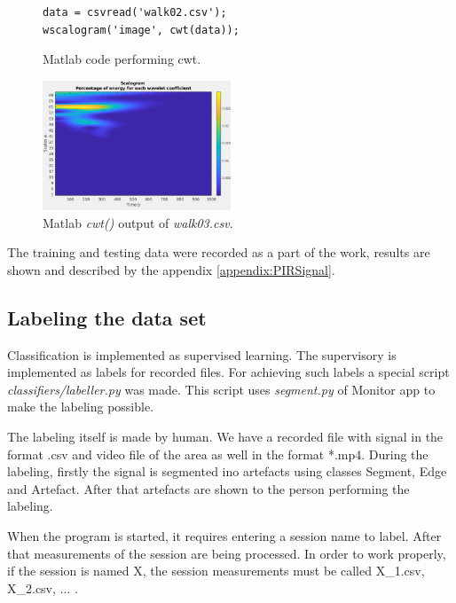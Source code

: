 \begin{figure}[h!]
\begin{lstlisting}[style=matlab]
data = csvread('walk02.csv');
wscalogram('image', cwt(data));
\end{lstlisting}
\caption{Matlab code performing cwt.\label{list:cwtmatlab}}
\end{figure}

\begin{figure}[h!]
\begin{center}
\includegraphics[width=0.5\textwidth]{img/walk03.png}
\caption{Matlab {\it cwt()} output of {\it walk03.csv}.\label{fig:walk03}}
\end{center}
\end{figure}


The training and testing data were recorded as a part of the work, results are
shown and described by the appendix \ref{appendix:PIRSignal}.

\subsection*{Labeling the data set}
Classification is implemented as supervised learning. The supervisory is implemented
as labels for recorded files. For achieving such labels a special script {\it classifiers/labeller.py}
was made. This script uses {\it segment.py} of Monitor app to make the labeling possible.

The labeling itself is made by human. We have a recorded file with signal in the format .csv
and video file of the area as well in the format *.mp4. During the labeling, firstly the 
signal is segmented ino artefacts using classes Segment, Edge and Artefact. After that
artefacts are shown to the person performing the labeling.

When the program is started, it requires entering a session name to label. After that
measurements of the session are being processed. In order to work properly, if the
session is named X, the session measurements must be called X\_1.csv, X\_2.csv, ... .

